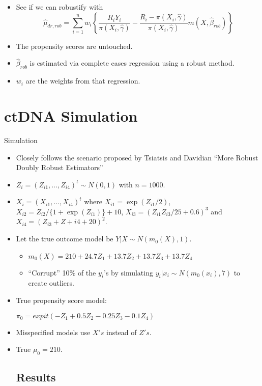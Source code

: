 \documentclass[xcolor=x11names,compress,table]{beamer}
\renewcommand{\(}{\begin{columns}}
\renewcommand{\)}{\end{columns}}
\newcommand{\<}[1]{\begin{column}{#1}}
\renewcommand{\>}{\end{column}}
\begin{document}
\begin{frame}
\begin{itemize}
\item See if we can robustify with
$$\hat{\mu}_{dr,rob} =  \sum_{i=1}^n w_i \left\{ \frac{R_i Y_i}{\pi(X_i, \hat{\gamma})} - \frac{R_i -  \pi(X_i, \hat{\gamma})}{\pi(X_i, \hat{\gamma})} m(X, \hat{\beta}_{rob}) \right\}$$
\item The propensity scores are untouched.
\item $\hat{\beta}_{rob}$ is estimated via complete cases regression using a robust method. 
\item $w_i$ are the weights from that regression.
\end{itemize}
\end{frame}

\section{ctDNA  Simulation}
\begin{frame}{Simulation}
\begin{itemize}
\item Closely follows the scenario proposed by Tsiatsis and Davidian ``More Robust Doubly Robust Estimators''
\item $Z_i = (Z_{i1}, \ldots, Z_{i4})^t \sim N(0, 1)$ with $n=1000$.
\item $X_i = (X_{i1}, \ldots, X_{i4})^t$ where $X_{i1} = \exp(Z_{i1}/2)$, $X_{i2} = Z_{i2}/\{1 + \exp(Z_{i1})\} + 10$, $X_{i3} = (Z_{i1}Z_{i3}/25 + 0.6)^3$ and $X_{i4} = (Z_{i3} + Z+{i4} + 20)^2$.
\item Let the true outcome model be $Y|X \sim N(m_0(X), 1)$.
\begin{itemize}
\item $m_0(X) = 210 + 24.7 Z_1 + 13.7 Z_2 + 13.7 Z_3 + 13.7 Z_4$
\item ``Corrupt'' 10\% of the $y_i$'s by simulating $y_i | x_i \sim N(m_0(x_i), 7)$ to create outliers.
\end{itemize} 
\item True propensity score model:

\quad $\pi_0 = expit(-Z_1 + 0.5 Z_2 - 0.25 Z_3 - 0.1 Z_4)$
\item Misspecified models use $X's$ instead of $Z's$.
\item True $\mu_0 = 210$. 

\subsection{Results}
\end{itemize}
\end{frame}
\end{document}
